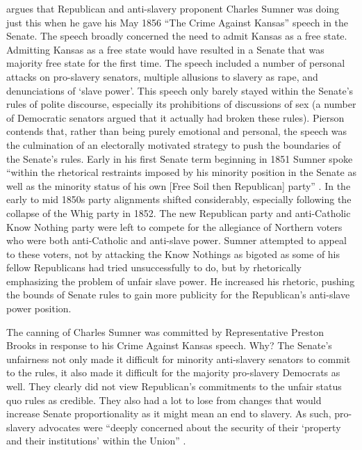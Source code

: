 \documentclass[a4paper]{article}\usepackage[]{graphicx}\usepackage[]{color}
\begin{document}
\cite{Pierson1995} argues that Republican and anti-slavery proponent Charles Sumner was doing just this when he gave his May 1856 ``The Crime Against Kansas'' speech in the Senate. The speech broadly concerned the need to admit Kansas as a free state. Admitting Kansas as a free state would have resulted in a Senate that was majority free state for the first time. The speech included a number of personal attacks on pro-slavery senators, multiple allusions to slavery as rape, and denunciations of `slave power'. This speech only barely stayed within the Senate's rules of polite discourse, especially its prohibitions of discussions of sex (a number of Democratic senators argued that it actually had broken these rules). Pierson contends that, rather than being purely emotional and personal, the speech was the culmination of an electorally motivated strategy to push the boundaries of the Senate's rules. Early in his first Senate term beginning in 1851 Sumner spoke ``within the rhetorical restraints imposed by his minority position in the Senate as well as the minority status of his own [Free Soil then Republican] party'' \cite[534]{Pierson1995}. In the early to mid 1850s party alignments shifted considerably, especially following the collapse of the Whig party in 1852. The new Republican party and anti-Catholic Know Nothing party were left to compete for the allegiance of Northern voters who were both anti-Catholic and anti-slave power. Sumner attempted to appeal to these voters, not by attacking the Know Nothings as bigoted as some of his fellow Republicans had tried unsuccessfully to do, but by rhetorically emphasizing the problem of unfair slave power. He increased his rhetoric, pushing the bounds of Senate rules to gain more publicity for the Republican's anti-slave power position.   

The canning of Charles Sumner was committed by Representative Preston Brooks in response to his Crime Against Kansas speech. Why? The Senate's unfairness not only made it difficult for minority anti-slavery senators to commit to the rules, it also made it difficult for the majority pro-slavery Democrats as well. They clearly did not view Republican's commitments to the unfair status quo rules as credible. They also had a lot to lose from changes that would increase Senate proportionality as it might mean an end to slavery. As such, pro-slavery advocates were ``deeply concerned about the security of their `property and their institutions' within the Union'' \cite[281]{Mittal2013}. 
\end{document}
